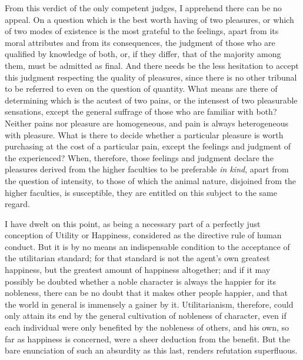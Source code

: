 From this verdict of the only competent judges, I apprehend there can
be no appeal. On a question which is the best worth having of two
pleasures, or which of two modes of existence is the most grateful to
the feelings, apart from its moral attributes and from its
consequences, the judgment of those who are qualified by knowledge of
both, or, if they differ, that of the majority among them, must be
admitted as final. And there needs be the less hesitation to accept
this judgment respecting the quality of pleasures, since there is no
other tribunal to be referred to even on the question of quantity.
What means are there of determining which is the acutest of two
 pains, or the intensest of two pleasurable sensations,
except the general suffrage of those who are familiar with both?
Neither pains nor pleasure are homogeneous, and pain is always
heterogeneous with pleasure. What is there to decide whether a
particular pleasure is worth purchasing at the cost of a particular
pain, except the feelings and judgment of the experienced? When,
therefore, those feelings and judgment declare the pleasures derived
from the higher faculties to be preferable \textit{in kind}, apart
from the question of intensity, to those of which the animal nature,
disjoined from the higher faculties, is susceptible, they are entitled
on this subject to the same regard.

I have dwelt on this point, as being a necessary part of a perfectly
just conception of Utility or Happiness, considered as the directive
rule of human conduct. But it is by no means an indispensable
condition to the acceptance of the utilitarian standard; for that
standard is not the agent's own greatest happiness, but the greatest
amount of happiness altogether; and if it may possibly be doubted
whether a noble character is always the happier for its nobleness,
there can be no doubt that it makes other people happier, and that the
world in general is immensely a gainer by it. Utilitarianism,
therefore, could only attain its end by the general cultivation of
nobleness of character, even if each individual were only benefited by
the nobleness of others, and his own, so far as happiness is
concerned, were a sheer deduction from the benefit. But the bare
enunciation of such an absurdity as this last, renders refutation
superfluous.

